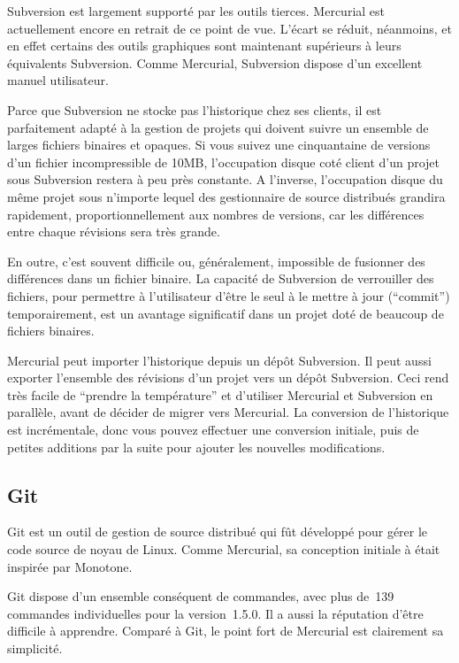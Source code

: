 Subversion est largement supporté par les outils tierces. Mercurial est
actuellement encore en retrait de ce point de vue. L'écart se réduit, néanmoins,
et en effet certains des outils graphiques sont maintenant supérieurs à leurs
équivalents Subversion. Comme Mercurial, Subversion dispose d'un excellent
manuel utilisateur.

Parce que Subversion ne stocke pas l'historique chez ses clients, il est 
parfaitement adapté à la gestion de projets qui doivent suivre un ensemble
de larges fichiers binaires et opaques. Si vous suivez une cinquantaine de
versions d'un fichier incompressible de 10MB, l'occupation disque coté client
d'un projet sous Subversion restera à peu près constante. A l'inverse, 
l'occupation disque du même projet sous n'importe lequel des gestionnaire
de source distribués grandira rapidement, proportionnellement aux nombres
de versions, car les différences entre chaque révisions sera très grande.

En outre, c'est souvent difficile ou, généralement, impossible de fusionner
des différences dans un fichier binaire. La capacité de Subversion de 
verrouiller des fichiers, pour permettre à l'utilisateur d'être le seul
à le mettre à jour (``commit'') temporairement, est un avantage significatif
dans un projet doté de beaucoup de fichiers binaires.

Mercurial peut importer l'historique depuis un dépôt Subversion. Il peut
aussi exporter l'ensemble des révisions d'un projet vers un dépôt Subversion.
Ceci rend très facile de ``prendre la température'' et d'utiliser Mercurial et Subversion
en parallèle, avant de décider de migrer vers Mercurial. La conversion de 
l'historique est incrémentale, donc vous pouvez effectuer une conversion 
initiale, puis de petites additions par la suite pour ajouter les nouvelles
modifications.

\subsection{Git}

Git est un outil de gestion de source distribué qui fût développé pour gérer
le code source de noyau de Linux. Comme Mercurial, sa conception initiale à 
était inspirée par Monotone.

Git dispose d'un ensemble conséquent de commandes, avec plus de~139 commandes
individuelles pour la version~1.5.0. Il a aussi la réputation d'être difficile
à apprendre. Comparé à Git, le point fort de Mercurial est clairement sa 
simplicité.

